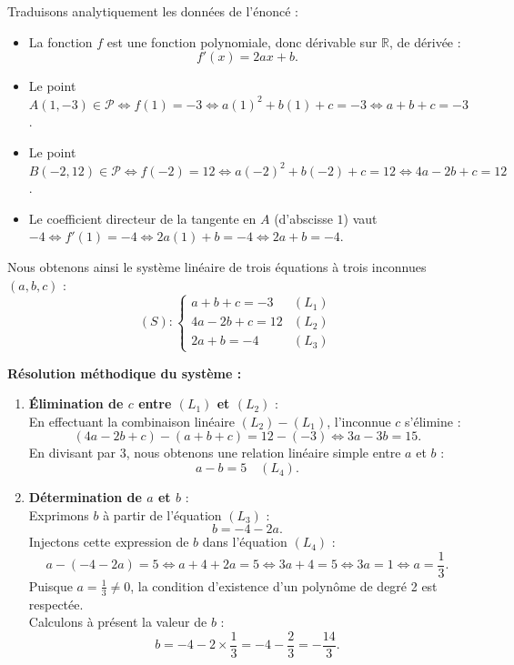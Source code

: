 \documentclass[11pt,a4paper]{article}
\newcommand{\R}{\mathbb{R}}
\begin{document}
\begin{correctionbox}
Traduisons analytiquement les données de l'énoncé :
\begin{itemize}
    \item La fonction $f$ est une fonction polynomiale, donc dérivable sur $\R$, de dérivée :
    \[
    f'(x) = 2ax + b.
    \]
    \item Le point $A(1, -3) \in \mathcal{P} \iff f(1) = -3 \iff a(1)^2 + b(1) + c = -3 \iff a + b + c = -3$.
    \item Le point $B(-2, 12) \in \mathcal{P} \iff f(-2) = 12 \iff a(-2)^2 + b(-2) + c = 12 \iff 4a - 2b + c = 12$.
    \item Le coefficient directeur de la tangente en $A$ (d'abscisse $1$) vaut $-4 \iff f'(1) = -4 \iff 2a(1) + b = -4 \iff 2a + b = -4$.
\end{itemize}

Nous obtenons ainsi le système linéaire de trois équations à trois inconnues $(a, b, c)$ :
\[
(S) : \begin{cases}
a + b + c = -3 & (L_1) \\
4a - 2b + c = 12 & (L_2) \\
2a + b = -4 & (L_3)
\end{cases}
\]

\textbf{Résolution méthodique du système :}
\begin{enumerate}[label=\textbf{Étape \arabic* :}]
    \item \textbf{Élimination de $c$ entre $(L_1)$ et $(L_2)$} :\\
    En effectuant la combinaison linéaire $(L_2) - (L_1)$, l'inconnue $c$ s'élimine :
    \[
    (4a - 2b + c) - (a + b + c) = 12 - (-3) \iff 3a - 3b = 15.
    \]
    En divisant par $3$, nous obtenons une relation linéaire simple entre $a$ et $b$ :
    \[
    a - b = 5 \quad (L_4).
    \]

    \item \textbf{Détermination de $a$ et $b$} :\\
    Exprimons $b$ à partir de l'équation $(L_3)$ :
    \[
    b = -4 - 2a.
    \]
    Injectons cette expression de $b$ dans l'équation $(L_4)$ :
    \[
    a - (-4 - 2a) = 5 \iff a + 4 + 2a = 5 \iff 3a + 4 = 5 \iff 3a = 1 \iff a = \frac{1}{3}.
    \]
    Puisque $a = \frac{1}{3} \neq 0$, la condition d'existence d'un polynôme de degré 2 est respectée.\\
    Calculons à présent la valeur de $b$ :
    \[
    b = -4 - 2 \times \frac{1}{3} = -4 - \frac{2}{3} = -\frac{14}{3}.
    \]


\end{enumerate}
\end{correctionbox}
\end{document}
